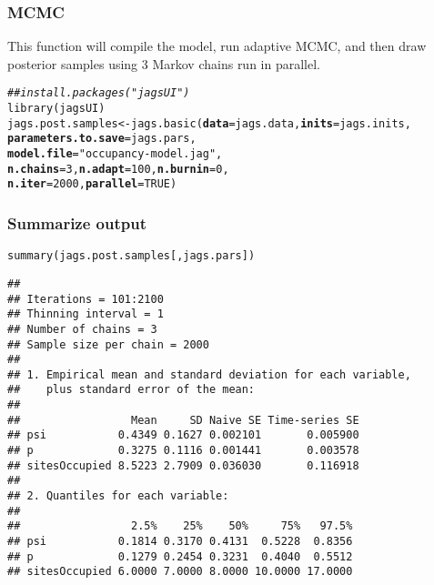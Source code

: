 \documentclass[color=usenames,dvipsnames]{beamer}\usepackage[]{graphicx}\usepackage[]{xcolor}
\makeatletter
\newcommand{\hlnum}[1]{\textcolor[rgb]{0.69,0.494,0}{#1}}%
\newcommand{\hlsng}[1]{\textcolor[rgb]{0.749,0.012,0.012}{#1}}%
\newcommand{\hlcom}[1]{\textcolor[rgb]{0.514,0.506,0.514}{\textit{#1}}}%
\newcommand{\hldef}[1]{\textcolor[rgb]{0,0,0}{#1}}%
\newcommand{\hlkwb}[1]{\textcolor[rgb]{0,0.341,0.682}{#1}}%
\newcommand{\hlkwc}[1]{\textcolor[rgb]{0,0,0}{\textbf{#1}}}%
\newcommand{\hlkwd}[1]{\textcolor[rgb]{0.004,0.004,0.506}{#1}}%
\newenvironment{kframe}{%
 \def\at@end@of@kframe{}%
 \ifinner\ifhmode%
  \def\at@end@of@kframe{\end{minipage}}%
  \begin{minipage}{\columnwidth}%
 \fi\fi%
 \def\FrameCommand##1{\hskip\@totalleftmargin \hskip-\fboxsep
 \colorbox{shadecolor}{##1}\hskip-\fboxsep
     \hskip-\linewidth \hskip-\@totalleftmargin \hskip\columnwidth}%
 \MakeFramed {\advance\hsize-\width
   \@totalleftmargin\z@ \linewidth\hsize
   \@setminipage}}%
 {\par\unskip\endMakeFramed%
 \at@end@of@kframe}
\newenvironment{knitrout}{}{} %
\makeatother
\begin{document}
\begin{frame}[fragile]
  \frametitle{MCMC}
  \small
  This function will compile the model, run adaptive MCMC, and then
  draw posterior samples using 3 Markov chains run in parallel. \\
\begin{knitrout}\scriptsize
{}\color{fgcolor}\begin{kframe}
\begin{alltt}
\hlcom{## install.packages("jagsUI")}
\hlkwd{library}\hldef{(jagsUI)}
\hldef{jags.post.samples} \hlkwb{<-} \hlkwd{jags.basic}\hldef{(}\hlkwc{data}\hldef{=jags.data,} \hlkwc{inits}\hldef{=jags.inits,}
                                \hlkwc{parameters.to.save}\hldef{=jags.pars,}
                                \hlkwc{model.file}\hldef{=}\hlsng{"occupancy-model.jag"}\hldef{,}
                                \hlkwc{n.chains}\hldef{=}\hlnum{3}\hldef{,} \hlkwc{n.adapt}\hldef{=}\hlnum{100}\hldef{,} \hlkwc{n.burnin}\hldef{=}\hlnum{0}\hldef{,}
                                \hlkwc{n.iter}\hldef{=}\hlnum{2000}\hldef{,} \hlkwc{parallel}\hldef{=}\hlnum{TRUE}\hldef{)}
\end{alltt}
\end{kframe}
\end{knitrout}
\end{frame}



\begin{frame}[fragile]
  \frametitle{Summarize output}
\begin{knitrout}\scriptsize
{}\color{fgcolor}\begin{kframe}
\begin{alltt}
\hlkwd{summary}\hldef{(jags.post.samples[,jags.pars])}
\end{alltt}
\begin{verbatim}
## 
## Iterations = 101:2100
## Thinning interval = 1 
## Number of chains = 3 
## Sample size per chain = 2000 
## 
## 1. Empirical mean and standard deviation for each variable,
##    plus standard error of the mean:
## 
##                 Mean     SD Naive SE Time-series SE
## psi           0.4349 0.1627 0.002101       0.005900
## p             0.3275 0.1116 0.001441       0.003578
## sitesOccupied 8.5223 2.7909 0.036030       0.116918
## 
## 2. Quantiles for each variable:
## 
##                 2.5%    25%    50%     75%   97.5%
## psi           0.1814 0.3170 0.4131  0.5228  0.8356
## p             0.1279 0.2454 0.3231  0.4040  0.5512
## sitesOccupied 6.0000 7.0000 8.0000 10.0000 17.0000
\end{verbatim}
\end{kframe}
\end{knitrout}
\end{frame}
\end{document}
